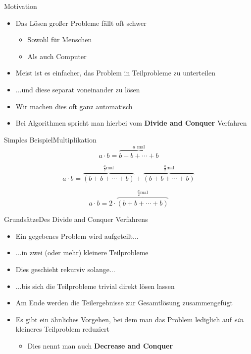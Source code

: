 \begin{frame}{Motivation}
    \begin{itemize}
        \item Das Lösen großer Probleme fällt oft schwer
        \begin{itemize}
            \item Sowohl für Menschen
            \item Als auch Computer
        \end{itemize}
        \item Meist ist es einfacher, das Problem in Teilprobleme zu unterteilen
        \item ...und diese separat voneinander zu lösen
        \item Wir machen dies oft ganz automatisch
        \item Bei Algorithmen spricht man hierbei vom \textbf{Divide and Conquer} Verfahren
    \end{itemize}
\end{frame}

\begin{frame}{Simples Beispiel}{Multiplikation}
    $$a\cdot b = \overbrace{b+b+\cdots+b}^{a\text{ mal}}$$
    
    $$a\cdot b = \overbrace{(b+b+\cdots+b)}^{\frac{a}{2}\text{mal}} + \overbrace{(b+b+\cdots+b)}^{\frac{a}{2}\text{mal}} $$
    
    $$a\cdot b = 2\cdot \overbrace{(b+b+\cdots+b)}^{\frac{a}{2}\text{mal}}$$
\end{frame}

\begin{frame}{Grundsätze}{Des Divide and Conquer Verfahrens}
    \begin{itemize}
        \item Ein gegebenes Problem wird aufgeteilt...
        \item ...in zwei (oder mehr) kleinere Teilprobleme
        \item Dies geschieht rekursiv solange...
        \item ...bis sich die Teilprobleme trivial direkt lösen lassen
        \item Am Ende werden die Teilergebnisse zur Gesamtlösung zusammengefügt
        \item Es gibt ein ähnliches Vorgehen, bei dem man das Problem lediglich auf \textit{ein} kleineres Teilproblem reduziert
        \begin{itemize}
            \item Dies nennt man auch \textbf{Decrease and Conquer}
        \end{itemize}
    \end{itemize}
\end{frame}

